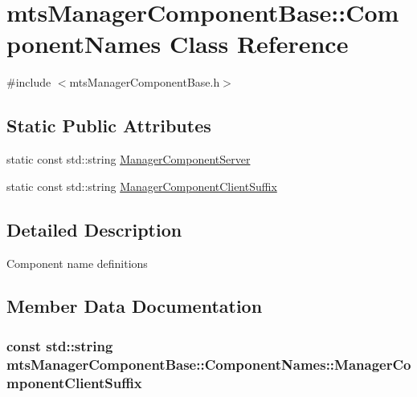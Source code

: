 \hypertarget{classmts_manager_component_base_1_1_component_names}{}\section{mts\+Manager\+Component\+Base\+:\+:Component\+Names Class Reference}
\label{classmts_manager_component_base_1_1_component_names}


{\ttfamily \#include $<$mts\+Manager\+Component\+Base.\+h$>$}

\subsection*{Static Public Attributes}
\begin{DoxyCompactItemize}
\item 
static const std\+::string \hyperlink{classmts_manager_component_base_1_1_component_names_ac0d5e1fbe029076826e635b1d309cb41}{Manager\+Component\+Server}
\item 
static const std\+::string \hyperlink{classmts_manager_component_base_1_1_component_names_a7d237d677cbf6bf322307d4cae5f5a4d}{Manager\+Component\+Client\+Suffix}
\end{DoxyCompactItemize}


\subsection{Detailed Description}
Component name definitions 

\subsection{Member Data Documentation}
\hypertarget{classmts_manager_component_base_1_1_component_names_a7d237d677cbf6bf322307d4cae5f5a4d}{}
\subsubsection[{Manager\+Component\+Client\+Suffix}]{\setlength{\rightskip}{0pt plus 5cm}const std\+::string mts\+Manager\+Component\+Base\+::\+Component\+Names\+::\+Manager\+Component\+Client\+Suffix\hspace{0.3cm}{\ttfamily [static]}}\label{classmts_manager_component_base_1_1_component_names_a7d237d677cbf6bf322307d4cae5f5a4d}
\hypertarget{classmts_manager_component_base_1_1_component_names_ac0d5e1fbe029076826e635b1d309cb41}{}
